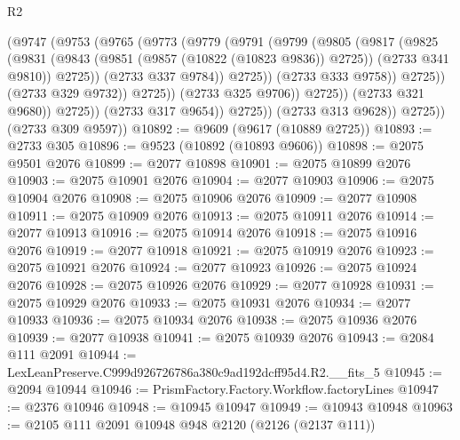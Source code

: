 \begin{lexlean}{R2}
\begin{coremodule}
                              (@9747
                                (@9753
                                  (@9765
                                    (@9773
                                      (@9779
                                        (@9791
                                          (@9799
                                            (@9805
                                              (@9817
                                                (@9825
                                                  (@9831
                                                    (@9843
                                                      (@9851 (@9857 (@10822 (@10823 @9836)) @2725))
                                                      (@2733 @341 @9810))
                                                    @2725))
                                                (@2733 @337 @9784))
                                              @2725))
                                          (@2733 @333 @9758))
                                        @2725))
                                    (@2733 @329 @9732))
                                  @2725))
                              (@2733 @325 @9706))
                            @2725))
                        (@2733 @321 @9680))
                      @2725))
                  (@2733 @317 @9654))
                @2725))
            (@2733 @313 @9628))
          @2725))
      (@2733 @309 @9597))
@10892 := @9609 (@9617 (@10889 @2725))
@10893 := @2733 @305
@10896 := @9523 (@10892 (@10893 @9606))
@10898 := @2075 @9501 @2076
@10899 := @2077 @10898
@10901 := @2075 @10899 @2076
@10903 := @2075 @10901 @2076
@10904 := @2077 @10903
@10906 := @2075 @10904 @2076
@10908 := @2075 @10906 @2076
@10909 := @2077 @10908
@10911 := @2075 @10909 @2076
@10913 := @2075 @10911 @2076
@10914 := @2077 @10913
@10916 := @2075 @10914 @2076
@10918 := @2075 @10916 @2076
@10919 := @2077 @10918
@10921 := @2075 @10919 @2076
@10923 := @2075 @10921 @2076
@10924 := @2077 @10923
@10926 := @2075 @10924 @2076
@10928 := @2075 @10926 @2076
@10929 := @2077 @10928
@10931 := @2075 @10929 @2076
@10933 := @2075 @10931 @2076
@10934 := @2077 @10933
@10936 := @2075 @10934 @2076
@10938 := @2075 @10936 @2076
@10939 := @2077 @10938
@10941 := @2075 @10939 @2076
@10943 := @2084 @111 @2091
@10944 := LexLeanPreserve.C999d926726786a380c9ad192dcff95d4.R2.__fits_5
@10945 := @2094 @10944
@10946 := PrismFactory.Factory.Workflow.factoryLines
@10947 := @2376 @10946
@10948 := @10945 @10947
@10949 := @10943 @10948
@10963 := @2105
    @111
    @2091
    @10948
    @948
    @2120
    (@2126 (@2137 @111))

\end{coremodule}
\end{lexlean}
